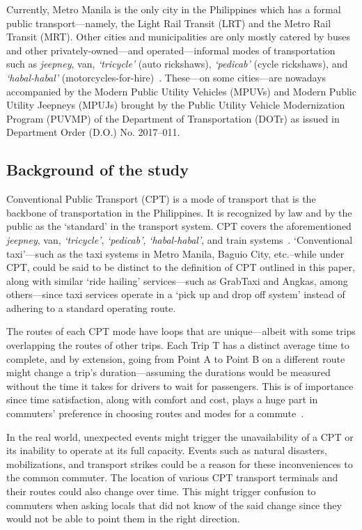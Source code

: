 \documentclass[journal]{./IEEE/IEEEtran}
\begin{document}
Currently, Metro Manila is the only city in the Philippines which has a formal public transport---namely, the Light Rail Transit (LRT) and the Metro Rail Transit (MRT). Other cities and municipalities are only mostly catered by buses and other privately-owned---and operated---informal modes of transportation such as \textit{jeepney}, van, \textit{`tricycle'} (auto rickshaws), \textit{`pedicab'} (cycle rickshaws), and \textit{`habal-habal'} (motorcycles-for-hire)~\cite{Mayo20}.
These---on some cities---are nowadays accompanied by the Modern Public Utility Vehicles (MPUVs) and Modern Public Utility Jeepneys (MPUJs) brought by the Public Utility Vehicle Modernization Program (PUVMP) of the Department of Transportation (DOTr) as issued in Department Order (D.O.) No. 2017--011. %


\subsection{Background of the study}
Conventional Public Transport (CPT) is a mode of transport that is the backbone of transportation in the Philippines. It is recognized by law and by the public as the `standard' in the transport system. CPT covers the aforementioned \textit{jeepney}, van, \textit{`tricycle'}, \textit{`pedicab'}, \textit{`habal-habal'}, and train systems~\cite{RamizoJr19}.
`Conventional taxi'---such as the taxi systems in Metro Manila, Baguio City, etc.\---while under CPT, could be said to be distinct to the definition of CPT outlined in this paper, along with similar `ride hailing' services---such as GrabTaxi and Angkas, among others---since taxi services operate in a `pick up and drop off system' instead of adhering to a standard operating route.

The routes of each CPT mode have loops that are unique---albeit with some trips overlapping the routes of other trips. Each Trip T has a distinct average time to complete, and by extension, going from Point A to Point B on a different route might change a trip's duration---assuming the durations would be measured without the time it takes for drivers to wait for passengers.
This is of importance since time satisfaction, along with comfort and cost, plays a huge part in commuters' preference in choosing routes and modes for a commute~\cite{Mayo20}.

In the real world, unexpected events might trigger the unavailability of a CPT or its inability to operate at its full capacity. Events such as natural disasters, mobilizations, and transport strikes could be a reason for these inconveniences to the common commuter.
The location of various CPT transport terminals and their routes could also change over time. This might trigger confusion to commuters when asking locals that did not know of the said change since they would not be able to point them in the right direction. \\ %
\end{document}
